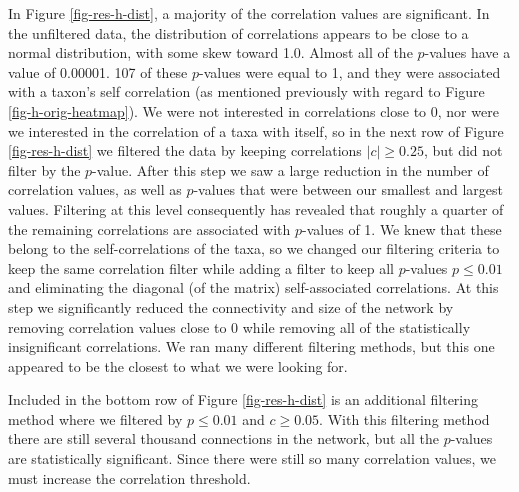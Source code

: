  In Figure \ref{fig-res-h-dist}, a majority of the correlation values are significant. In the unfiltered data, the distribution of correlations appears to be close to a normal distribution, with some skew toward 1.0. Almost all of the $p$-values have a value of 0.00001. 107 of these $p$-values were equal to 1, and they were associated with a taxon's self correlation (as mentioned previously with regard to Figure \ref{fig-h-orig-heatmap}). 
 We were not interested in correlations close to 0, nor were we interested in the correlation of a taxa with itself, so in the next row of Figure \ref{fig-res-h-dist} we filtered the data by keeping correlations $|c| \geq 0.25$, but did not filter by the $p$-value. After this step we saw a large reduction in the number of correlation values, as well as $p$-values that were between our smallest and largest values. Filtering at this level consequently has revealed that roughly a quarter of the remaining correlations are associated with $p$-values of 1. We knew that these belong to the self-correlations of the taxa, so we changed our filtering criteria to keep the same correlation filter while adding a filter to keep all $p$-values $p \leq 0.01$ and eliminating the diagonal (of the matrix) self-associated correlations. At this step we significantly reduced the connectivity and size of the network by removing correlation values close to 0 while removing all of the statistically insignificant correlations. We ran many different filtering methods, but this one appeared to be the closest to what we were looking for.
 
 Included in the bottom row of Figure \ref{fig-res-h-dist} is an additional filtering method where we filtered by $p \leq 0.01$ and $c \geq 0.05$. With this filtering method there are still several thousand connections in the network, but all the $p$-values are statistically significant. Since there were still so many correlation values, we must increase the correlation threshold. 

